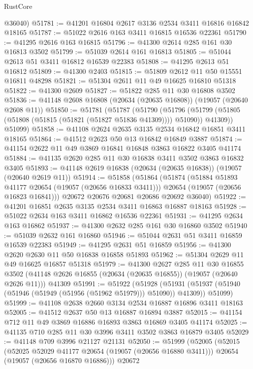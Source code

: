 \begin{lexlean}{RustCore}
\begin{coremodule}
      @36040)
@51781 := @41201 @16804 @2617 @3136 @2534 @3411 @16816 @16842 @18165
@51787 := @51022 @2616 @163 @3411 @16815 @16536 @22361
@51790 := @41295 @2616 @163 @16815
@51796 := @41300 @2614 @285 @161 @30 @16813 @3502
@51799 := @51039 @2614 @161 @16813
@51805 := @51044 @2613 @51 @3411 @16812 @16539 @22383
@51808 := @41295 @2613 @51 @16812
@51809 := @41300 @2403
@51815 := @51809 @2612 @11 @50 @15551 @16811 @48298
@51821 := @51304 @2611 @11 @49 @16625 @16810 @51318
@51822 := @41300 @2609
@51827 := @51822 @285 @11 @30 @16808 @3502
@51836 := @41148 @2608 @16808 (@20634 (@20635 @16808)) (@19057 (@20640 @2608 @11))
@51850 := @51781
    (@51787
      (@51790
        (@51796 (@51799 (@51805 (@51808 (@51815 (@51821 (@51827 @51836 @41309)))) @51090)) @41309))
      @51099)
@51858 := @41108 @2624 @2635 @3135 @2534 @16842 @16851 @3411 @18165
@51864 := @41512 @2623 @50 @13 @16842 @16849 @3887
@51874 := @41154 @2622 @11 @49 @3869 @16841 @16848 @3863 @16822 @3405 @41174
@51884 := @41135 @2620 @285 @11 @30 @16838 @3411 @3502 @3863 @16832 @3405
@51893 := @41148 @2619 @16838 (@20634 (@20635 @16838)) (@19057 (@20640 @2619 @11))
@51914 := @51858
    (@51864
      (@51874
        (@51884 @51893 @41177 @20654 (@19057 (@20656 @16833 @3411)))
        @20654
        (@19057 (@20656 @16823 @16841)))
      @20672
      @20676
      @20681
      @20686
      @20692
      @36040)
@51922 := @41201 @16851 @2635 @3135 @2534 @3411 @16863 @16887 @18163
@51928 := @51022 @2634 @163 @3411 @16862 @16536 @22361
@51931 := @41295 @2634 @163 @16862
@51937 := @41300 @2632 @285 @161 @30 @16860 @3502
@51940 := @51039 @2632 @161 @16860
@51946 := @51044 @2631 @51 @3411 @16859 @16539 @22383
@51949 := @41295 @2631 @51 @16859
@51956 := @41300 @2620 @2630 @11 @50 @16838 @16858 @51893
@51962 := @51304 @2629 @11 @49 @16625 @16857 @51318
@51979 := @41300
    @2627
    @285
    @11
    @30
    @16855
    @3502
    (@41148 @2626 @16855 (@20634 (@20635 @16855)) (@19057 (@20640 @2626 @11)))
    @41309
@51991 := @51922
    (@51928
      (@51931 (@51937 (@51940 (@51946 (@51949 (@51956 (@51962 @51979))) @51090)) @41309))
      @51099)
@51999 := @41108 @2638 @2660 @3134 @2534 @16887 @16896 @3411 @18163
@52005 := @41512 @2637 @50 @13 @16887 @16894 @3887
@52015 := @41154 @712 @11 @49 @3869 @16886 @16893 @3863 @16869 @3405 @41174
@52025 := @41135 @710 @285 @11 @30 @3996 @3411 @3502 @3863 @16879 @3405
@52029 := @41148 @709 @3996 @21127 @21131
@52050 := @51999
    (@52005
      (@52015
        (@52025 @52029 @41177 @20654 (@19057 (@20656 @16880 @3411)))
        @20654
        (@19057 (@20656 @16870 @16886)))
      @20672

\end{coremodule}
\end{lexlean}
